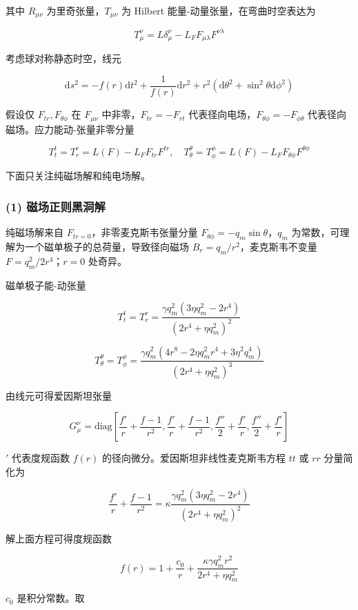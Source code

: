 \documentclass[aps,prl,preprint,groupedaddress,showkeys]{revtex4-2}
\begin{document}
其中 $R_{\mu\nu} $ 为里奇张量，$T_{\mu\nu} $ 为 Hilbert 能量-动量张量，在弯曲时空表达为

$$
T_\mu^\nu
=L\delta_\mu^\nu - L_F F_{\mu\lambda} F^{\nu \lambda}
$$

考虑球对称静态时空，线元

$$
\mathrm{d}s^2
=-f(r)\mathrm{d}t^2 + \frac{1 }{f(r) } \mathrm{d}r^2 + r^2\left(\mathrm{d}\theta^2+\sin^2\theta\mathrm{d}\phi^2 \right)
$$

假设仅 $F_{tr},F_{\theta\phi} $ 在 $F_{\mu\nu} $ 中非零，$F_{tr}=-F_{rt} $ 代表径向电场，$F_{\theta\phi}=-F_{\phi\theta} $ 代表径向磁场。应力能动-张量非零分量

$$
T_t^t = T_r^r
=L(F) - L_F F_{tr}F^{tr},\quad 
T_\theta^\theta
=T_\phi^\phi
=L(F) - L_F F_{\theta\phi}F^{\theta\phi}
$$

下面只关注纯磁场解和纯电场解。

\subsubsection{(1) 磁场正则黑洞解}

纯磁场解来自 $F_{tr=0} $，非零麦克斯韦张量分量 $F_{\theta\phi}=-q_m \sin\theta $，$q_m $ 为常数，可理解为一个磁单极子的总荷量，导致径向磁场 $B_r=q_m/r^2 $，麦克斯韦不变量 $F=q_m^2/2r^4 $；$r=0 $ 处奇异。

磁单极子能-动张量

$$
T_t^t
=T_r^r
=\frac{\gamma q_m^2\left(3\eta q_m^2-2r^4 \right) }{\left(2r^4+\eta q_m^2 \right)^2 }
$$

$$
T_\theta^\theta
=T_\phi^\phi
=\frac{\gamma q_m^2\left(4 r^8-2\eta q_m^2 r^4+3\eta^2q_m^4 \right) }{\left(2r^4+\eta q_m^2 \right)^3 }
$$

由线元可得爱因斯坦张量

$$
G_\mu^\nu
=\mathrm{diag}\left[\frac{f' }{r } + \frac{f-1 }{r^2 } ,\frac{f' }{r } + \frac{f-1 }{r^2 } , \frac{f'' }{2 } + \frac{f' }{r } , \frac{f'' }{2 } + \frac{f' }{r }  \right]
$$

$' $ 代表度规函数 $f(r) $ 的径向微分。爱因斯坦非线性麦克斯韦方程 $tt $ 或 $rr $ 分量简化为

$$
\frac{f' }{r } + \frac{f-1 }{r^2 } 
=\kappa \frac{\gamma q_m^2\left(3\eta q_m^2-2r^4 \right) }{\left(2r^4+\eta q_m^2 \right)^2 }
$$

解上面方程可得度规函数

$$
f(r)
=1+\frac{c_0 }{r } + \frac{\kappa \gamma q_m^2 r^2 }{2r^4+\eta q_m^2 } 
$$

$c_0 $ 是积分常数。取
\end{document}
